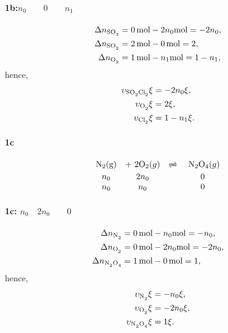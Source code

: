 \documentclass[main.tex]{subfiles}
\begin{document}
\paragraph{1b:$n_0 \qquad 0 \qquad n_1$}
\begin{align*}
    \Delta n_{\ce{SO3}} &= \SI{0}{\mole} - 2n_0\SI{}{\mole} = -2n_0, \\
    \Delta n_{\ce{SO2}} &= \SI{2}{\mole} - \SI{0}{\mole} = 2, \\
    \Delta n_{\ce{O2}} &= \SI{1}{\mole} - n_1\SI{}{\mole} = 1-n_1,
\end{align*}
hence,
\begin{align*}
    \upsilon_{\ce{SO2Cl2}}\xi &= -2n_0\xi, \\
    \upsilon_{\ce{O2}}\xi &= 2\xi, \\
    \upsilon_{\ce{Cl2}}\xi &= 1-n_1\xi.
\end{align*}


\paragraph{1c}%
\begin{gather*}
\begin{array}{cccc}
    \mathrm{N}_2(\mathrm{g}) &+~2\mathrm{O}_2(g) & \xrightleftharpoons &~ \mathrm{N}_2\mathrm{O}_4(g) \\
    n_0 & 2n_0 & & 0\\
    n_0 & n_0 & & 0\\
\end{array}    
\end{gather*}

\paragraph{1c: $n_0 \quad 2n_0 \qquad 0$}
\begin{align*}
    \Delta n_{\ce{N2}} &= \SI{0}{\mole} - n_0\SI{}{\mole} = -n_0, \\
    \Delta n_{\ce{O2}} &= \SI{0}{\mole} - 2n_0\SI{}{\mole} = -2n_0, \\
    \Delta n_{\ce{N2O4}} &= \SI{1}{\mole} - \SI{0}{\mole} = 1,
\end{align*}
hence,
\begin{align*}
    \upsilon_{\ce{N2}}\xi &= -n_0\xi, \\
    \upsilon_{\ce{O2}}\xi &= -2n_0\xi, \\
    \upsilon_{\ce{N2O4}}\xi &= 1\xi.
\end{align*}
\end{document}
